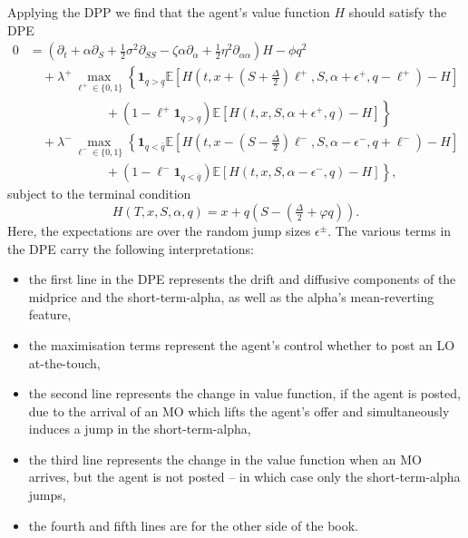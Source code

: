 \documentclass[11pt, a4paper]{book}
\newcommand{\E}{\mathbb{E}}
\newcommand{\Ind}{\mathbf{1}}
\begin{document}
	Applying the DPP we find that the agent's value function $H$ should satisfy the DPE
	\begin{align*}
		0 &= \left( \partial_t + \alpha \partial_S + \tfrac{1}{2}\sigma^2 \partial_{SS} - \zeta \alpha \partial_\alpha + \tfrac{1}{2}\eta^2 \partial_{\alpha \alpha} \right) H - \phi q^2 \\
		&\quad + \lambda^+ \max_{\ell^+ \in \{0,1\}} \left\{ \Ind_{q > \underline{q}} \E \left[ H\left(t, x + (S + \tfrac{\Delta}{2})\ell^+, S, \alpha + \epsilon^+, q - \ell^+\right) - H \right] \right. \\
		&\qquad \qquad \qquad + \left. \left(1 - \ell^+ \Ind_{q > \underline{q}}\right) \E \left[ H(t, x, S, \alpha + \epsilon^+, q) - H \right] \right\} \\
		&\quad + \lambda^- \max_{\ell^- \in \{0,1\}} \left\{ \Ind_{q < \bar{q}} \E \left[ H\left(t, x - (S - \tfrac{\Delta}{2})\ell^-, S, \alpha - \epsilon^-, q + \ell^-\right) - H \right] \right. \\
		&\qquad \qquad \qquad + \left. \left(1 - \ell^- \Ind_{q < \bar{q}}\right) \E \left[ H(t, x, S, \alpha - \epsilon^-, q) - H \right] \right\},
	\end{align*}
	subject to the terminal condition
	\[
	H(T, x, S, \alpha, q) = x + q \left(S - (\tfrac{\Delta}{2} + \varphi q)\right).
	\]
	Here, the expectations are over the random jump sizes $\epsilon^\pm$. The various terms in the DPE carry the following interpretations:
	\begin{itemize}
		\item the first line in the DPE represents the drift and diffusive components of the midprice and the short-term-alpha, as well as the alpha's mean-reverting feature,
		\item the maximisation terms represent the agent's control whether to post an LO at-the-touch,
		\item the second line represents the change in value function, if the agent is posted, due to the arrival of an MO which lifts the agent's offer and simultaneously induces a jump in the short-term-alpha,
		\item the third line represents the change in the value function when an MO arrives, but the agent is not posted – in which case only the short-term-alpha jumps,
		\item the fourth and fifth lines are for the other side of the book.
	\end{itemize}
	
\end{document}

